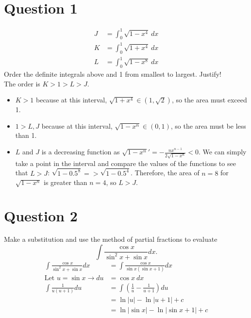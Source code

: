 \documentclass{article}
\begin{document}
\newcommand{\documentcourse}{MATH1851}
\newcommand{\documentnumber}{3}





\section*{Question 1}
\begin{align*}
    J & =\int_0^1\sqrt{1-x^4}\:dx \\K&=\int_0^1\sqrt{1+x^4}\:dx\\L&=\int_0^1\sqrt{1-x^8}\:dx
\end{align*}
Order the definite integrals above and 1 from smallest to largest. Justify!
\\
The order is $K > 1 > L > J$.
\begin{itemize}
    \item $K > 1$ because at this interval, $\sqrt{1+x^4} \in (1,\sqrt{2})$, so the area must exceed 1.
    \item $1 > L, J$ because at this interval, $\sqrt{1-x^n} \in (0,1)$, so the area must be less than 1.
    \item $L$ and $J$ is a decreasing function as $\sqrt{1-x^n}' = -\frac{nx^{n-1}}{2\sqrt{1-x^n}} < 0$. We can simply take a point in the interval and compare the values of the functions to see that $L > J$: $\sqrt{1-0.5^8} =  > \sqrt{1-0.5^4}$. Therefore, the area of $n=8$ for $\sqrt{1-x^n}$ is greater than $n=4$, so $L > J$.
\end{itemize}

\section*{Question 2}
Make a substitution and use the method of partial fractions to evaluate
\[\int\frac{\cos x}{\sin^2x+\sin x}dx.\]
\begin{align*}
    \int\frac{\cos x}{\sin^2x+\sin x}dx & =\int\frac{\cos x}{\sin x(\sin x+1)}dx \\
    \text{Let }u=\sin x \rightarrow du  & =\cos x\:dx                            \\
    \int\frac{1}{u(u+1)}du              & =\int(\frac{1}{u}-\frac{1}{u+1})du     \\
                                        & =\ln|u|-\ln|u+1|+c                     \\
                                        & =\ln|\sin x|-\ln|\sin x+1|+c
\end{align*}
\end{document}
